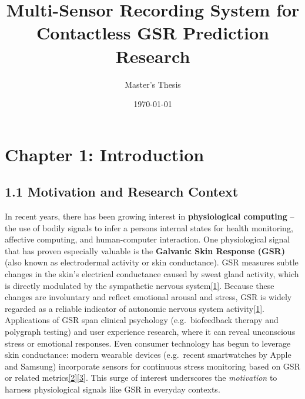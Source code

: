 \documentclass[12pt,a4paper]{article}
\title{Multi-Sensor Recording System for Contactless GSR Prediction Research}
\author{Master's Thesis}
\date{\today}
\begin{document}
\maketitle
\newpage

\tableofcontents
\newpage

\section{Chapter 1: Introduction}\label{chapter-1-introduction}

\subsection{1.1 Motivation and Research Context}\label{motivation-and-research-context}

In recent years, there has been growing interest in \textbf{physiological computing} -- the use of bodily signals to infer a person\textquotesingle s internal states for health monitoring, affective computing, and human-computer interaction. One physiological signal that has proven especially valuable is the \textbf{Galvanic Skin Response (GSR)} (also known as electrodermal activity or skin conductance). GSR measures subtle changes in the skin's electrical conductance caused by sweat gland activity, which is directly modulated by the sympathetic nervous system\href{https://pmc.ncbi.nlm.nih.gov/articles/PMC8187483/\#:~:text=Galvanic\%20skin\%20response\%20,conditions\%20which\%20recent\%20studies\%20have}{{[}1{]}}. Because these changes are involuntary and reflect emotional arousal and stress, GSR is widely regarded as a reliable indicator of autonomic nervous system activity\href{https://pmc.ncbi.nlm.nih.gov/articles/PMC8187483/\#:~:text=Galvanic\%20skin\%20response\%20,conditions\%20which\%20recent\%20studies\%20have}{{[}1{]}}. Applications of GSR span clinical psychology (e.g.~biofeedback therapy and polygraph testing) and user experience research, where it can reveal unconscious stress or emotional responses. Even consumer technology has begun to leverage skin conductance: modern wearable devices (e.g.~recent smartwatches by Apple and Samsung) incorporate sensors for continuous stress monitoring based on GSR or related metrics\href{docs/thesis_report/draft/bibliography.md\#L2-L5}{{[}2{]}{[}3{]}}. This surge of interest underscores the \emph{motivation} to harness physiological signals like GSR in everyday contexts.
\end{document}
